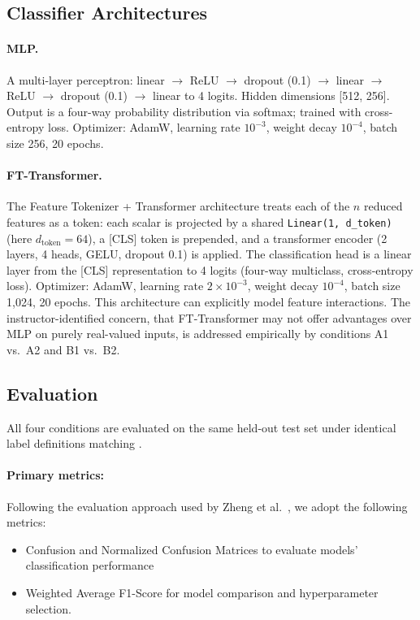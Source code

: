 \documentclass[10pt,twocolumn,letterpaper]{article}
\begin{document}
\subsection{Classifier Architectures}

\paragraph{MLP.}
A multi-layer perceptron: linear $\to$ ReLU $\to$ dropout (0.1) $\to$ linear $\to$ ReLU $\to$ dropout (0.1) $\to$ linear to 4 logits. Hidden dimensions [512, 256]. Output is a four-way probability distribution via softmax; trained with cross-entropy loss. Optimizer: AdamW, learning rate $10^{-3}$, weight decay $10^{-4}$, batch size 256, 20 epochs.

\paragraph{FT-Transformer.}
The Feature Tokenizer + Transformer architecture \cite{gorishniy_revisiting_2023} treats each of the $n$ reduced features as a token: each scalar is projected by a shared \texttt{Linear(1, d\_token)} (here $d_{\mathrm{token}}=64$), a [CLS] token is prepended, and a transformer encoder (2 layers, 4 heads, GELU, dropout 0.1) is applied. The classification head is a linear layer from the [CLS] representation to 4 logits (four-way multiclass, cross-entropy loss). Optimizer: AdamW, learning rate $2 \times 10^{-3}$, weight decay $10^{-4}$, batch size 1,024, 20 epochs. This architecture can explicitly model feature interactions. The instructor-identified concern, that FT-Transformer may not offer advantages over MLP on purely real-valued inputs, is addressed empirically by conditions A1 vs.\ A2 and B1 vs.\ B2.

\subsection{Evaluation}

All four conditions are evaluated on the same held-out test set under identical label definitions matching \cite{zheng2022}.

\paragraph{Primary metrics:}

Following the evaluation approach used by Zheng et al.\ \cite{zheng2022}, we adopt the following metrics:
\begin{itemize}
    \item Confusion and Normalized Confusion Matrices to evaluate models' classification performance
    \item Weighted Average F1-Score for model comparison and
    hyperparameter selection.
\end{itemize}
\end{document}
